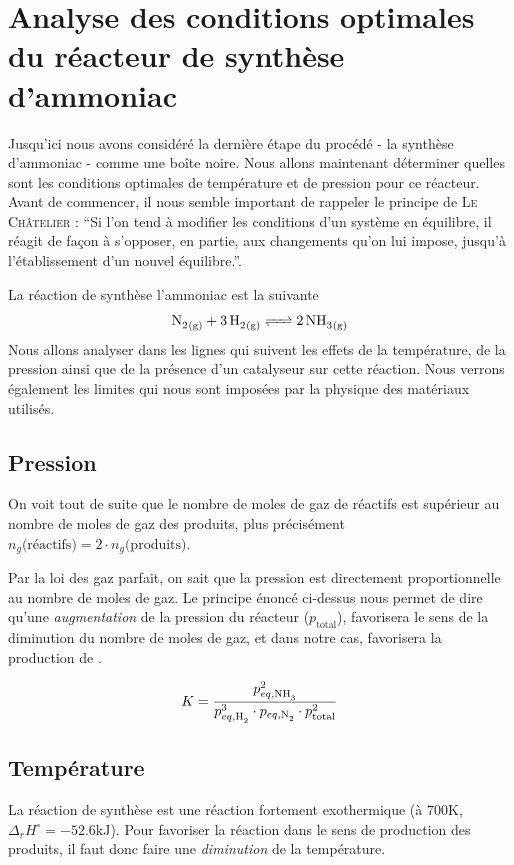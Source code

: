 

\section{Analyse des conditions optimales du réacteur de synthèse d'ammoniac}

Jusqu'ici nous avons considéré la dernière étape du procédé - la synthèse d'ammoniac -
comme une bo\^ite noire. Nous allons maintenant déterminer quelles sont les conditions 
optimales de température et de pression pour ce réacteur. 
Avant de commencer, il nous semble important de rappeler le principe 
de \textsc{Le Ch\^atelier} : \enquote{Si l'on tend à modifier les conditions d'un système en équilibre, 
il réagit de façon à s'opposer, en partie, aux changements qu'on lui impose, 
jusqu'à l'établissement d'un nouvel équilibre.}. \cite{chatelier}

La réaction de synthèse l'ammoniac est la suivante
\[\ce{N2_{(g)} + 3H2_{(g)} <=> 2NH3_{(g)} } \]
Nous allons analyser dans les lignes qui suivent les effets de la température, de la pression ainsi que
de la présence d'un catalyseur sur cette réaction. Nous verrons également les limites qui nous sont
imposées par la physique des matériaux utilisés. 

\subsection{Pression}

On voit tout de suite que le nombre de moles de gaz de réactifs est supérieur 
au nombre de moles de gaz des produits, 
plus précisément $n_{g}\text{(réactifs)} = 2 \cdot n_{g}\text{(produits)}$.

Par la loi des gaz parfait, on sait que la pression est directement proportionnelle 
au nombre de moles de gaz. Le principe énoncé ci-dessus
nous permet de dire qu'une \emph{augmentation} de la pression du réacteur ($p_{\text{total}}$),
favorisera le sens de la diminution du nombre de moles de gaz, 
et dans notre cas, favorisera la production de .

\[
K = \frac{p_{eq,\ce{NH3}}^2}{p_{eq,\ce{H2}}^3 \cdot p_{eq,\ce{N2}} \cdot p_{\text{total}}^2}
\]
\subsection{Température}

La réaction de synthèse est une réaction fortement exothermique 
(à $700\si{\kelvin}$, $\Delta_r H^{\circ} = -52.6\si{\kilo\joule}$).
Pour favoriser la réaction dans le sens de production des produits,
il faut donc faire une \emph{diminution} de la température.

